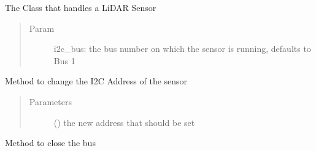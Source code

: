 \documentclass[letterpaper,10pt,english]{sphinxmanual}
\begin{document}
\begin{fulllineitems}
\label{\detokenize{sensor:lib.sensor.Sensor}}
The Class that handles a LiDAR Sensor
\begin{quote}\begin{description}
\item[{Param}] \leavevmode
i2c\_bus: the bus number on which the sensor is running, defaults to Bus 1

\end{description}\end{quote}

\begin{fulllineitems}
\label{\detokenize{sensor:lib.sensor.Sensor.change_addr}}
Method to change the I2C Address of the sensor
\begin{quote}\begin{description}
\item[{Parameters}] \leavevmode
{} () \textendash{} the new address that should be set

\end{description}\end{quote}

\end{fulllineitems}


\begin{fulllineitems}
\label{\detokenize{sensor:lib.sensor.Sensor.close}}
Method to close the bus

\end{fulllineitems}



\end{fulllineitems}
\end{document}
